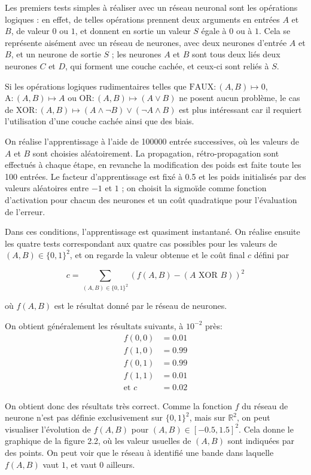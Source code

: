 Les premiers tests simples à réaliser avec un réseau neuronal sont les opérations logiques : en effet, de telles opérations prennent deux arguments en entrées $A$ et $B$, de valeur $0$ ou $1$, et donnent en sortie un valeur $S$ égale à $0$ ou à $1$. Cela se représente aisément avec un réseau de neurones, avec deux neurones d'entrée $A$ et $B$, et un neurone de sortie $S$ ; les neurones $A$ et $B$ sont tous deux liés deux neurones $C$ et $D$, qui forment une couche cachée, et ceux-ci sont reliés à $S$.

Si les opérations logiques rudimentaires telles que $\text{FAUX}: (A, B) \mapsto 0$, $\text{A}: (A, B) \mapsto A$ ou $\text{OR}: (A, B) \mapsto (A ∨ B)$ ne posent aucun problème, le cas de $\text{XOR}: (A, B) \mapsto (A ∧ ¬B) ∨ (¬A ∧ B)$ est plus intéressant car il requiert l'utilisation d'une couche cachée ainsi que des biais.

On réalise l'apprentissage à l'aide de 100000 entrée successives, où les valeurs de $A$ et $B$ sont choisies aléatoirement. La propagation, rétro-propagation sont effectués à chaque étape, en revanche la modification des poids est faite toute les 100 entrées. Le facteur d'apprentissage est fixé à 0.5 et les poids initialisés par des valeurs aléatoires entre $-1$ et $1$ ; on choisit la sigmoïde comme fonction d'activation pour chacun des neurones et un coût quadratique pour l'évaluation de l'erreur.

Dans ces conditions, l'apprentissage est quasiment instantané. On réalise ensuite les quatre tests correspondant aux quatre cas possibles pour les valeurs de $(A, B) \in \{0, 1\}^2$, et on regarde la valeur obtenue et le coût final $c$ défini par

\[ c = \sum_{(A, B) \in \{0, 1\}^2} (f(A, B) - (A \text{ XOR } B))^2 \]

où $f(A, B)$ est le résultat donné par le réseau de neurones.

On obtient généralement les résultats suivants, à $10^{-2}$ près:
\[\begin{split}
f(0, 0) &= 0.01 \\
f(1, 0) &= 0.99 \\
f(0, 1) &= 0.99 \\
f(1, 1) &= 0.01 \\
\text{et }c &= 0.02
\end{split}\]

On obtient donc des résultats très correct. Comme la fonction $f$ du réseau de neurone n'est pas définie exclusivement sur $\{0, 1\}^2$, mais sur $\mathbb{R}^2$, on peut visualiser l'évolution de $f(A, B)$ pour $(A, B) \in [-0.5, 1.5]^2$. Cela donne le graphique de la figure 2.2, où les valeur usuelles de $(A, B)$ sont indiquées par des points. On peut voir que le réseau à identifié une bande dans laquelle $f(A, B)$ vaut $1$, et vaut $0$ ailleurs.

